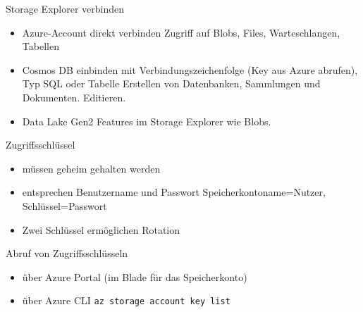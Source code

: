 \begin{flashcard}[Definition]{Storage Explorer verbinden}
    \begin{itemize}
        \item Azure-Account direkt verbinden\newline
        Zugriff auf Blobs, Files, Warteschlangen, Tabellen
        \item Cosmos DB einbinden mit Verbindungszeichenfolge (Key aus Azure abrufen), Typ SQL oder Tabelle\newline
        Erstellen von Datenbanken, Sammlungen und Dokumenten. Editieren.
        \item Data Lake Gen2\newline
        Features im Storage Explorer wie Blobs.
    \end{itemize}
\end{flashcard}


\begin{flashcard}[Definition]{Zugriffsschlüssel}
    \begin{itemize}
        \item müssen geheim gehalten werden
        \item entsprechen Benutzername und Passwort\newline
            Speicherkontoname=Nutzer, Schlüssel=Passwort
        \item Zwei Schlüssel ermöglichen Rotation
    \end{itemize}
    \vspace{1cm}
    Abruf von Zugriffsschlüsseln
    \begin{itemize}
        \item über Azure Portal (im Blade für das Speicherkonto)
        \item über Azure CLI\newline
            \texttt{az storage account key list}
    \end{itemize}
\end{flashcard}


